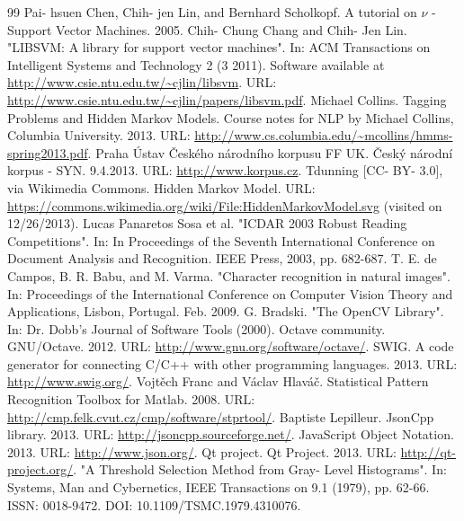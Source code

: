 \documentclass[12pt,a4paper]{report}
\begin{document}
\begin{thebibliography}{99}
 Pai- hsuen Chen, Chih- jen Lin, and Bernhard Scholkopf. A tutorial on $\nu$ - Support Vector Machines. 2005.
 Chih- Chung Chang and Chih- Jen Lin. "LIBSVM: A library for support vector machines". In: ACM Transactions on Intelligent Systems and Technology 2 (3 2011). Software available at \url{http://www.csie.ntu.edu.tw/~cjlin/libsvm}. URL: \url{http://www.csie.ntu.edu.tw/~cjlin/papers/libsvm.pdf}.
 Michael Collins. Tagging Problems and Hidden Markov Models. Course notes for NLP by Michael Collins, Columbia University. 2013. URL: \url{http://www.cs.columbia.edu/~mcollins/hmms-spring2013.pdf}.
 Praha Ústav Českého národního korpusu FF UK. Český národní korpus - SYN. 9.4.2013. URL: \url{http://www.korpus.cz}.
 Tdunning [CC- BY- 3.0], via Wikimedia Commons. Hidden Markov Model. URL: \url{https://commons.wikimedia.org/wiki/File:HiddenMarkovModel.svg} (visited on 12/26/2013).
 Lucas Panaretos Sosa et al. "ICDAR 2003 Robust Reading Competitions". In: In Proceedings of the Seventh International Conference on Document Analysis and Recognition. IEEE Press, 2003, pp. 682-687.
 T. E. de Campos, B. R. Babu, and M. Varma. "Character recognition in natural images". In: Proceedings of the International Conference on Computer Vision Theory and Applications, Lisbon, Portugal. Feb. 2009.
 G. Bradski. "The OpenCV Library". In: Dr. Dobb's Journal of Software Tools (2000).
 Octave community. GNU/Octave. 2012. URL: \url{http://www.gnu.org/software/octave/}.
 SWIG. A code generator for connecting C/C++ with other programming languages. 2013. URL: \url{http://www.swig.org/}.
 Vojtěch Franc and Václav Hlaváč. Statistical Pattern Recognition Toolbox for Matlab. 2008. URL: \url{http://cmp.felk.cvut.cz/cmp/software/stprtool/}.
 Baptiste Lepilleur. JsonCpp library. 2013. URL: \url{http://jsoncpp.sourceforge.net/}.
 JavaScript Object Notation. 2013. URL: \url{http://www.json.org/}.
 Qt project. Qt Project. 2013. URL: \url{http://qt-project.org/}.
 "A Threshold Selection Method from Gray- Level Histograms". In: Systems, Man and Cybernetics, IEEE Transactions on 9.1 (1979), pp. 62-66. ISSN: 0018-9472. DOI: 10.1109/TSMC.1979.4310076.
\end{thebibliography}
\end{document}
